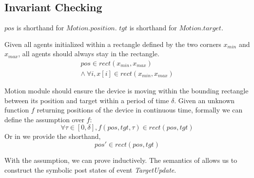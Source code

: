 

\subsection{Invariant Checking}

$pos$ is shorthand for $Motion.position$. $tgt$ is shorthand for $Motion.target$.

\begin{invariant}\label{inv:lineform}
Given all agents initialized within a rectangle defined by the two corners $x_{min}$ and $x_{max}$,
all agents should always stay in the rectangle.
\[
\begin{split}
    pos \in rect(x_{min}, x_{max})        \\
    \land\ \forall i, x[i] \in rect(x_{min}, x_{max})
\end{split}
\]
\end{invariant}


\begin{assumption}\label{lineform-assume}
Motion module should ensure the device is moving within the bounding rectangle between its position and target
within a period of time $\delta$.
Given an unknown function $f$ returning positions of the device in continuous time,
formally we can define the assumption over $f$:
\[
\forall \tau \in [0, \delta], f(pos, tgt, \tau) \in rect(pos, tgt)
\]
Or in \lgname we provide the shorthand,
\[
pos' \in rect(pos, tgt)
\]
\end{assumption}

With the assumption, we can prove  inductively.
The \K semantics of \lgname allows us to construct the symbolic post states of event \emph{TargetUpdate}.


\begin{figure}
\end{figure}



